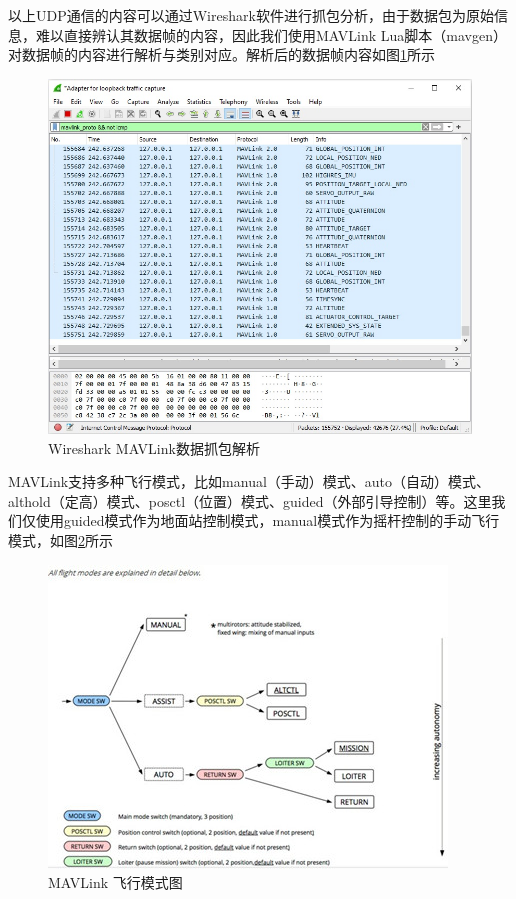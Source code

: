 以上UDP通信的内容可以通过Wireshark软件进行抓包分析，由于数据包为原始信息，难以直接辨认其数据帧的内容，因此我们使用MAVLink Lua脚本（mavgen）对数据帧的内容进行解析与类别对应。解析后的数据帧内容如图\ref{Fig:img11}所示

\begin{figure}[ht]
  \centering
  \includegraphics[width=0.8\linewidth]{./Figure/Mavlink_Wireshark_Decode.jpg}
  \caption{Wireshark MAVLink数据抓包解析}\label{Fig:img11}
\end{figure}

MAVLink支持多种飞行模式，比如manual（手动）模式、auto（自动）模式、althold（定高）模式、posctl（位置）模式、guided（外部引导控制）等。这里我们仅使用guided模式作为地面站控制模式，manual模式作为摇杆控制的手动飞行模式，如图\ref{Fig:img12}所示

\begin{figure}[ht]
  \centering
  \includegraphics[width=0.8\linewidth]{./Figure/Flight_Mode.png}
  \caption{MAVLink 飞行模式图}\label{Fig:img12}
\end{figure}

